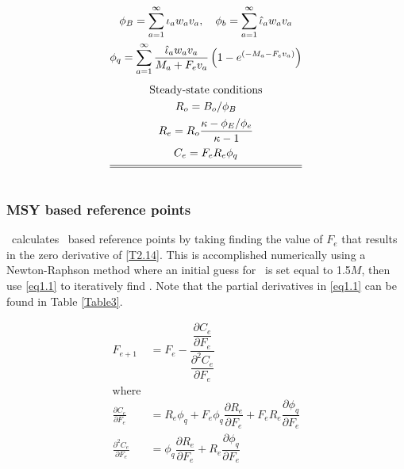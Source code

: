 \begin{multicols}{2}
\begin{tablehere}
\begin{gather}
            \phi_B=\sum_{a=1}^\infty \iota_a w_a v_a, \quad
            \phi_b=\sum_{a=1}^\infty \hat{\iota}_a w_a v_a \label{T2.11}\\
            \phi_q=\sum_{a=1}^\infty
                \frac{ \hat{\iota}_a w_a v_a}{M_a+F_ev_a}
                \left(1-e^{(-M_a-F_ev_a)}\right) \label{T2.11b} \\[1ex]
        \mbox{Steady-state conditions} \nonumber \\
        R_o=B_o/ \phi_B \label{T2.12}\\
        R_e=R_o\frac{\kappa-\phi_E/\phi_e}{\kappa-1} \label{T2.13}\\
        C_e=F_e R_e \phi_q\label{T2.14} \\[1ex]
        \hline \hline \nonumber
    \end{gather}
    \normalEq
\end{tablehere}

\subsubsection{MSY based reference points}
\iscam\ calculates \fmsy\ based reference points by taking finding the value of $F_e$ that results in the zero derivative of \eqref{T2.14}.  This is accomplished numerically using a Newton-Raphson method where an initial guess for \fmsy\ is set equal to 1.5$M$, then use \eqref{eq1.1} to iteratively find \fmsy.  Note that the partial derivatives in \eqref{eq1.1} can be found in Table \ref{Table3}.

\begin{align}\label{eq1.1}
    F_{e+1}&=F_e - 
    \dfrac{ \dfrac{\partial C_e}{\partial F_e}}
    { \dfrac{\partial^2 C_e}{\partial F_e}}\\
    \mbox{where}\nonumber\\
     \frac{\partial C_e}{\partial F_e} &=
    R_e \phi_q
    + F_e \phi_q \dfrac{\partial R_e}{\partial F_e}
    + F_e R_e \dfrac{\partial \phi_q}{\partial F_e} \nonumber\\
    \frac{\partial^2 C_e}{\partial F_e} &=
    \phi_q \dfrac{\partial R_e}{\partial F_e}
   +  R_e \dfrac{\partial \phi_q}{\partial F_e}\nonumber
\end{align}


\end{multicols}
